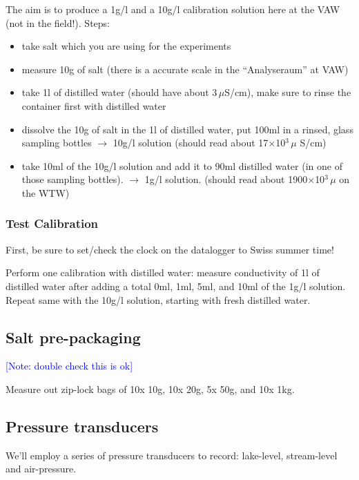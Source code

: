 \documentclass[DIV=15,halfparskip,11pt,headinclude]{scrartcl}
\newcommand{\note}[1]{\textcolor{blue}{[Note: #1]}}
\newcommand{\note}[1]{}
\begin{document}
The aim is to produce a 1g/l and a 10g/l calibration solution here at the VAW
(not in the field!).  Steps:
\begin{itemize}
\item take salt which you are using for the experiments
\item measure 10g of salt (there is a accurate scale in the
  ``Analyseraum'' at VAW)
\item take 1l of distilled water (should have about 3\,$\mu$S/cm),
  make sure to rinse the container first with distilled water
\item dissolve the 10g of salt in the 1l of distilled water, put 100ml in a rinsed, glass sampling bottles $\rightarrow$
  10g/l solution (should read about 17$\times$10$^3\,\mu$
  S/cm)
\item take 10ml of the 10g/l solution and add it to 90ml distilled
  water (in one of those sampling bottles).  $\rightarrow$ 1g/l
  solution.  (should read about 1900$\times$10$^3\,\mu$ on the WTW)
\end{itemize}

\subsubsection{Test Calibration}

First, be sure to set/check the clock on the datalogger to Swiss
summer time!

Perform one calibration with distilled water: measure conductivity of
1l of distilled water after adding a total 0ml, 1ml, 5ml, and 10ml of
the 1g/l solution.  Repeat same with the 10g/l solution, starting with
fresh distilled water.

\subsection{Salt pre-packaging}
\note{double check this is ok}

Measure out zip-lock bags of 10x 10g, 10x 20g, 5x 50g, and 10x 1kg.

\subsection{Pressure transducers}
\label{s:press-trans}

We'll employ a series of pressure transducers to record: lake-level,
stream-level and air-pressure.
\end{document}
